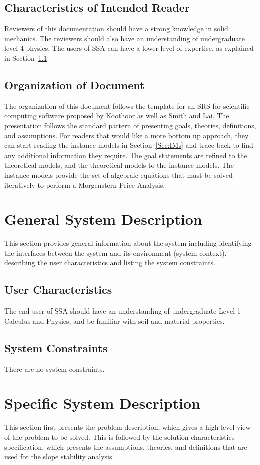 \documentclass[12pt]{article}
\begin{document}
\subsection{Characteristics of Intended Reader}
\label{Sec:ReaderChars}
Reviewers of this documentation should have a strong knowledge in solid mechanics. The reviewers should also have an understanding of undergraduate level 4 physics. The users of SSA can have a lower level of expertise, as explained in Section~\ref{Sec:UserChars}.
\subsection{Organization of Document}
\label{Sec:DocOrg}
The organization of this document follows the template for an SRS for scientific computing software proposed by Koothoor as well as Smith and Lai. The presentation follows the standard pattern of presenting goals, theories, definitions, and assumptions. For readers that would like a more bottom up approach, they can start reading the instance models in Section~\ref{Sec:IMs} and trace back to find any additional information they require.
The goal statements are refined to the theoretical models, and the theoretical models to the instance models. The instance models provide the set of algebraic equations that must be solved iteratively to perform a Morgenstern Price Analysis.
\section{General System Description}
\label{Sec:GenSysDesc}
This section provides general information about the system including identifying the interfaces between the system and its environment (system context), describing the user characteristics and listing the system constraints.
\subsection{User Characteristics}
\label{Sec:UserChars}
The end user of SSA should have an understanding of undergraduate Level 1 Calculus and Physics, and be familiar with soil and material properties.
\subsection{System Constraints}
\label{Sec:SysConstraints}
There are no system constraints.
\section{Specific System Description}
\label{Sec:SpecSystDesc}
This section first presents the problem description, which gives a high-level view of the problem to be solved. This is followed by the solution characteristics specification, which presents the assumptions, theories, and definitions that are used for the slope stability analysis.
\end{document}
